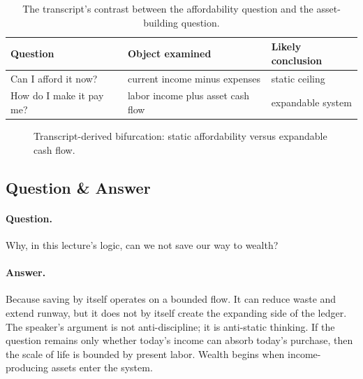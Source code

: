 \begin{table}[h]
\centering
\begin{tabular}{|l|l|l|}
\hline
Question & Object examined & Likely conclusion \\
\hline
Can I afford it now? & current income minus expenses & static ceiling \\
How do I make it pay me? & labor income plus asset cash flow & expandable system \\
\hline
\end{tabular}
\caption{The transcript's contrast between the affordability question and the asset-building question.}
\end{table}

\begin{figure}[h]
\centering
{}
\caption{Transcript-derived bifurcation: static affordability versus expandable cash flow.}
\end{figure}

\subsection{Question \& Answer}

\paragraph{Question.} Why, in this lecture's logic, can we not save our way to wealth?

\paragraph{Answer.} Because saving by itself operates on a bounded flow. It can reduce waste and extend runway, but it does not by itself create the expanding side of the ledger. The speaker's argument is not anti-discipline; it is anti-static thinking. If the question remains only whether today's income can absorb today's purchase, then the scale of life is bounded by present labor. Wealth begins when income-producing assets enter the system.

